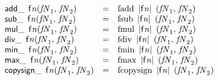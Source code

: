 $$
\begin{array}{@{}lcl@{}l@{}}
{{\mathsf{add}}{\mathsf{\_}}~\,{\mathsf{f}}{{\mathit{n}}}}{({\mathit{fN}}_{{1}},\, {\mathit{fN}}_{{2}})} &=& {\mathrm{fadd}}~\,{|{\mathsf{f}}{{\mathit{n}}}|}~\,({\mathit{fN}}_{{1}},\, {\mathit{fN}}_{{2}}) &  \\
{{\mathsf{sub}}{\mathsf{\_}}~\,{\mathsf{f}}{{\mathit{n}}}}{({\mathit{fN}}_{{1}},\, {\mathit{fN}}_{{2}})} &=& {\mathrm{fsub}}~\,{|{\mathsf{f}}{{\mathit{n}}}|}~\,({\mathit{fN}}_{{1}},\, {\mathit{fN}}_{{2}}) &  \\
{{\mathsf{mul}}{\mathsf{\_}}~\,{\mathsf{f}}{{\mathit{n}}}}{({\mathit{fN}}_{{1}},\, {\mathit{fN}}_{{2}})} &=& {\mathrm{fmul}}~\,{|{\mathsf{f}}{{\mathit{n}}}|}~\,({\mathit{fN}}_{{1}},\, {\mathit{fN}}_{{2}}) &  \\
{{\mathsf{div}}{\mathsf{\_}}~\,{\mathsf{f}}{{\mathit{n}}}}{({\mathit{fN}}_{{1}},\, {\mathit{fN}}_{{2}})} &=& {\mathrm{fdiv}}~\,{|{\mathsf{f}}{{\mathit{n}}}|}~\,({\mathit{fN}}_{{1}},\, {\mathit{fN}}_{{2}}) &  \\
{{\mathsf{min}}{\mathsf{\_}}~\,{\mathsf{f}}{{\mathit{n}}}}{({\mathit{fN}}_{{1}},\, {\mathit{fN}}_{{2}})} &=& {\mathrm{fmin}}~\,{|{\mathsf{f}}{{\mathit{n}}}|}~\,({\mathit{fN}}_{{1}},\, {\mathit{fN}}_{{2}}) &  \\
{{\mathsf{max}}{\mathsf{\_}}~\,{\mathsf{f}}{{\mathit{n}}}}{({\mathit{fN}}_{{1}},\, {\mathit{fN}}_{{2}})} &=& {\mathrm{fmax}}~\,{|{\mathsf{f}}{{\mathit{n}}}|}~\,({\mathit{fN}}_{{1}},\, {\mathit{fN}}_{{2}}) &  \\
{{\mathsf{copysign}}{\mathsf{\_}}~\,{\mathsf{f}}{{\mathit{n}}}}{({\mathit{fN}}_{{1}},\, {\mathit{fN}}_{{2}})} &=& {\mathrm{fcopysign}}~\,{|{\mathsf{f}}{{\mathit{n}}}|}~\,({\mathit{fN}}_{{1}},\, {\mathit{fN}}_{{2}}) &  \\
\end{array}
$$

